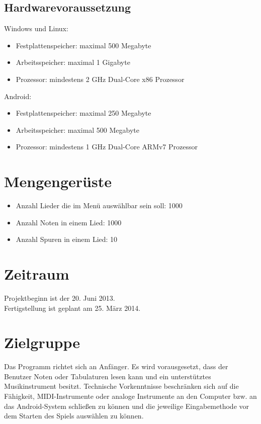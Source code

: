 \documentclass[12pt,a4paper]{report}
\begin{document}
      \subsection{Hardwarevoraussetzung}
      \begin{description}
      \item Windows und Linux:
      	\begin{itemize}
      	\item Festplattenspeicher: maximal 500 Megabyte
      	\item Arbeitsspeicher: maximal 1 Gigabyte
      	\item Prozessor: mindestens 2 GHz Dual-Core x86 Prozessor
      	\end{itemize}
      \item Android:
      	\begin{itemize}
      	\item Festplattenspeicher: maximal 250 Megabyte
      	\item Arbeitsspeicher: maximal 500 Megabyte
      	\item Prozessor: mindestens 1 GHz Dual-Core ARMv7 Prozessor
      	\end{itemize}
      \end{description}
    \section{Mengengerüste}
      \begin{itemize}
        \item Anzahl Lieder die im Menü auswählbar sein soll: 1000
        \item Anzahl Noten in einem Lied: 1000
        \item Anzahl Spuren in einem Lied: 10
      \end{itemize}
    \section{Zeitraum}
      Projektbeginn ist der 20. Juni 2013. \\ 
      Fertigstellung ist geplant am 25. März 2014.
    \section{Zielgruppe}
      Das Programm richtet sich an Anfänger. Es wird vorausgesetzt, dass der Benutzer Noten oder Tabulaturen lesen kann und ein unterstütztes Musikinstrument besitzt. Technische Vorkenntnisse beschränken sich auf die Fähigkeit, MIDI-Instrumente oder analoge Instrumente an den Computer bzw. an das Android-System schließen zu können und die jeweilige Eingabemethode vor dem Starten des Spiels auswählen zu können.
\end{document}

